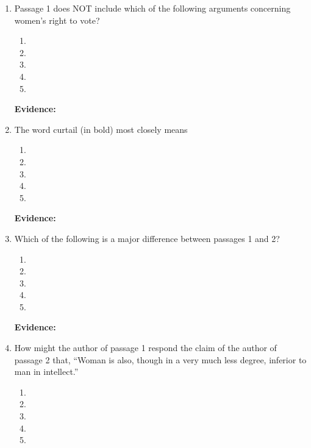 \bigskip
\begin{enumerate}

\item Passage 1 does NOT include which of the following arguments concerning women's right to vote?

\bigskip
\begin{enumerate}[label=(\Alph*)]
\item 
\item
\item 
\item 
\item 
\end{enumerate}

\bigskip
\textbf{Evidence:} \hrulefill

\bigskip
\item The word curtail (in bold) most closely means

\bigskip
\begin{enumerate}[label=(\Alph*)]
\item 
\item
\item 
\item 
\item 
\end{enumerate}

\bigskip
\textbf{Evidence:} \hrulefill

\bigskip
\item 

\bigskip Which of the following is a major difference between passages 1 and 2?
\begin{enumerate}[label=(\Alph*)]
\item 
\item
\item 
\item 
\item 
\end{enumerate}

\bigskip
\textbf{Evidence:} \hrulefill


\bigskip
\item How might the author of passage 1 respond the claim of the author of passage 2 that, ``Woman is also, though in a very much less degree, inferior to man in intellect.''

\bigskip
\begin{enumerate}[label=(\Alph*)]
\item 
\item
\item 
\item 
\item 
\end{enumerate}


\end{enumerate}
